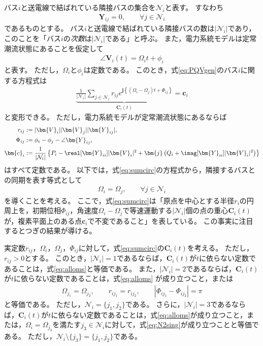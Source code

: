 \documentclass[tombow,dvipdfmx]{corona-a5}
\begin{document}
バス$i$と送電線で結ばれている隣接バスの集合を$\mathcal{N}_i$と表す。
すなわち
\begin{align*}
\bm{Y}_{ij} = 0,\qquad \forall j \in \mathcal{N}_i
\end{align*}
であるものとする。
バス$i$と送電線で結ばれている隣接バスの数は$|\mathcal{N}_i|$であり，このことを「バス$i$の\emph{次数}は$|\mathcal{N}_i|$である」と呼ぶ。
また，電力系統モデルは定常潮流状態にあることを仮定して
\begin{align*}
\angle \bm{V}_i (t) = \Omega_i t +\phi_i
\end{align*}
と表す。
ただし，$\Omega_i$と$\phi_i$は定数である。
このとき，式\ref{eq:PQVgen}のバス$i$に関する方程式は
\begin{align}\label{eq:sumcirc}
\underbrace{
\frac{1}{|\mathcal{N}_i|}\sum_{j \in \mathcal{N}_i } 
r_{ij}
e^{\bm{j} 
\left\{
(\Omega_i - \Omega_j)t + 
\Phi_{ij}
\right\} }
}_{\bm{C}_i (t)}
= \bm{c}_i
\end{align}
と変形できる。
ただし，電力系統モデルが定常潮流状態にあるならば
\begin{align*}
r_{ij} &:=|\bm{V}_i| |\bm{V}_j| |\bm{Y}_{ij}|, 
\\
\Phi_{ij} &:= \phi_i - \phi_j - \angle \bm{Y}_{ij},
\\
\bm{c}_i &:=  \frac{1}{|\mathcal{N}_i|}
\left\{
P_i - \real[\bm{Y}_{ii}] |\bm{V}_i|^2
+ \bm{j}
\left(
Q_i + \imag [\bm{Y}_{ii}] |\bm{V}_i|^2
\right)
\right\}
\end{align*}
はすべて定数である。
以下では，式\ref{eq:sumcirc}の方程式から，隣接するバスとの同期を表す等式として
\begin{align}\label{eq:alloms}
\Omega_i = \Omega_{j} 
,\qquad 
\forall j\in \mathcal{N}_i
\end{align}
を導くことを考える。
ここで，式\ref{eq:sumcirc}は「原点を中心とする半径$r_i$の円周上を，初期位相$\Phi_{ij}$，角速度$\Omega_i-\Omega_j$で等速運動する$|\mathcal{N}_i|$個の点の重心$\bm{C}_i (t)$が，複素平面上のある点$\bm{c}_i$で不変であること」を表している。
この事実に注目するとつぎの結果が導ける。


\begin{補題}\label{lem:sumc2}
実定数$r_{ij}$，$\Omega_i$，$\Omega_j$，$\Phi_{ij}$に対して，式\ref{eq:sumcirc}の$\bm{C}_i (t)$を考える。
ただし，$r_{ij}>0$とする。
このとき，$|\mathcal{N}_i|=1$であるならば，$\bm{C}_i (t)$が$t$に依らない定数であることは，式\ref{eq:alloms}と等価である。
また，$|\mathcal{N}_i|=2$であるならば，$\bm{C}_i (t)$が$t$に依らない定数であることは，式\ref{eq:alloms}
が成り立つこと，または
\begin{align}\label{eq:N2sing}
\Omega_{j_1} = \Omega_{j_2}
,\qquad
r_{i j_1} = r_{i j_2}
,\qquad
|\Phi_{i j_1}-\Phi_{i j_2}| = \pi
\end{align}
と等価である。
ただし，$\mathcal{N}_i = \{j_1,j_2\}$である。
さらに，$|\mathcal{N}_i|=3$であるならば，$\bm{C}_i (t)$が$t$に依らない定数であることは，式\ref{eq:alloms}が成り立つこと，または，$\Omega_{i} = \Omega_{j_3}$を満たす$j_3 \in \mathcal{N}_i$に対して，式\ref{eq:N2sing}が成り立つことと等価である。
ただし，$ \mathcal{N}_i \setminus \{j_3\}=\{j_1,j_2\}$である。
\end{補題}
\end{document}
